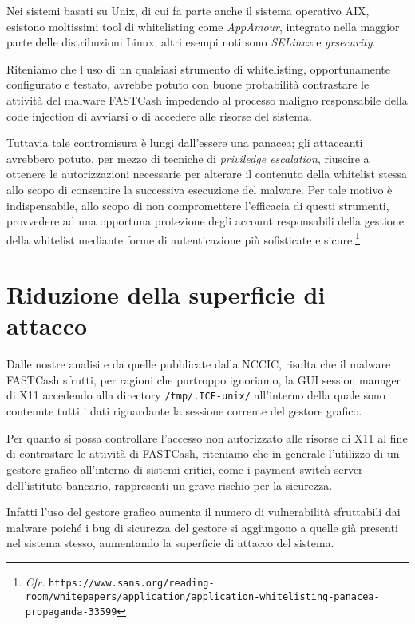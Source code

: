 \documentclass[10pt,a4paper, titlepage]{report}
\begin{document}
Nei sistemi basati su Unix, di cui fa parte anche il sistema operativo AIX, esistono moltissimi tool di whitelisting come \textit{AppAmour}, integrato nella maggior parte delle distribuzioni Linux; altri esempi noti sono \textit{SELinux} e \textit{grsecurity}.

Riteniamo che l'uso di un qualsiasi strumento di whitelisting, opportunamente configurato e testato, avrebbe potuto con buone probabilità contrastare le attività del malware FASTCash impedendo al processo maligno responsabile della code injection di avviarsi o di accedere alle risorse del sistema.

Tuttavia tale contromisura è lungi dall'essere una panacea; gli attaccanti avrebbero potuto, per mezzo di tecniche di \textit{priviledge escalation}, riuscire a ottenere le autorizzazioni necessarie per alterare il contenuto della whitelist stessa allo scopo di consentire la successiva esecuzione del malware. Per tale motivo è indispensabile, allo scopo di non compromettere l'efficacia di questi strumenti, provvedere ad una opportuna protezione degli account responsabili della gestione della whitelist mediante forme di autenticazione più sofisticate e sicure.\footnote{\textit{Cfr.} \texttt{https://www.sans.org/reading-room/whitepapers/application/application-whitelisting-panacea-propaganda-33599}}

\section{Riduzione della superficie di attacco}

Dalle nostre analisi e da quelle pubblicate dalla NCCIC, risulta che il malware FASTCash sfrutti, per ragioni che purtroppo ignoriamo, la GUI session manager di X11 accedendo alla directory \texttt{/tmp/.ICE-unix/} all'interno della quale sono contenute tutti i dati riguardante la sessione corrente del gestore grafico.

Per quanto si possa controllare l'accesso non autorizzato alle risorse di X11 al fine di contrastare le attività di FASTCash, riteniamo che in generale l'utilizzo di un gestore grafico all'interno di sistemi critici, come i  payment switch server dell'istituto bancario, rappresenti un grave rischio per la sicurezza. 

Infatti l'uso del gestore grafico aumenta il numero di vulnerabilità sfruttabili dai malware poiché i bug di sicurezza del gestore si aggiungono a quelle già presenti nel sistema stesso, aumentando la superficie di attacco del sistema. 
\end{document}
